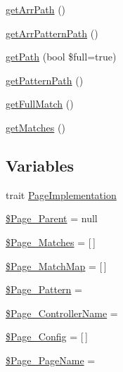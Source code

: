 \begin{DoxyCompactItemize}
\hyperlink{namespaceWEPPO_1_1Routing_a51ab99a3e6ac08fc2c9457c68beeb59c}{get\+Arr\+Path} ()
\item 
\hyperlink{namespaceWEPPO_1_1Routing_a65571499ac307bc6d0c9b45afb9edbc9}{get\+Arr\+Pattern\+Path} ()
\item 
\hyperlink{namespaceWEPPO_1_1Routing_a98f5b36932c650c6ca8fb5733422c8a0}{get\+Path} (bool \$full=true)
\item 
\hyperlink{namespaceWEPPO_1_1Routing_a1412416873298f139587493ae2970dae}{get\+Pattern\+Path} ()
\item 
\hyperlink{namespaceWEPPO_1_1Routing_aff94fd1aaafd49ffc7bef27d30a1432b}{get\+Full\+Match} ()
\item 
\hyperlink{namespaceWEPPO_1_1Routing_a8c3ec92eb0a4e31545555eef4755ca67}{get\+Matches} ()
\end{DoxyCompactItemize}
\subsection*{Variables}
\begin{DoxyCompactItemize}
\item 
trait \hyperlink{namespaceWEPPO_1_1Routing_aac0fe5dacae50c1c13751c1c3087ea23}{Page\+Implementation}
\item 
\hyperlink{namespaceWEPPO_1_1Routing_ada0493ec510703be558950d16b90a7f5}{\$\+Page\+\_\+\+Parent} = null
\item 
\hyperlink{namespaceWEPPO_1_1Routing_a238c346b9f68ddab9ce40d2094ffcb21}{\$\+Page\+\_\+\+Matches} = \mbox{[}$\,$\mbox{]}
\item 
\hyperlink{namespaceWEPPO_1_1Routing_aabacc51b76846d3f35a89de4ec669dc9}{\$\+Page\+\_\+\+Match\+Map} = \mbox{[}$\,$\mbox{]}
\item 
\hyperlink{namespaceWEPPO_1_1Routing_abc80c4144676c663ac4c7ced77e02494}{\$\+Page\+\_\+\+Pattern} = \textquotesingle{}\textquotesingle{}
\item 
\hyperlink{namespaceWEPPO_1_1Routing_ac1cd50e9921f7d4215806c1e179c3fe7}{\$\+Page\+\_\+\+Controller\+Name} = \textquotesingle{}\textquotesingle{}
\item 
\hyperlink{namespaceWEPPO_1_1Routing_a79e334dc5c377bf5384bcc4934b58bd8}{\$\+Page\+\_\+\+Config} = \mbox{[}$\,$\mbox{]}
\item 
\hyperlink{namespaceWEPPO_1_1Routing_ae8eda6bdaa0e8c0fa885c978fb315802}{\$\+Page\+\_\+\+Page\+Name} = \textquotesingle{}\textquotesingle{}
\end{DoxyCompactItemize}



